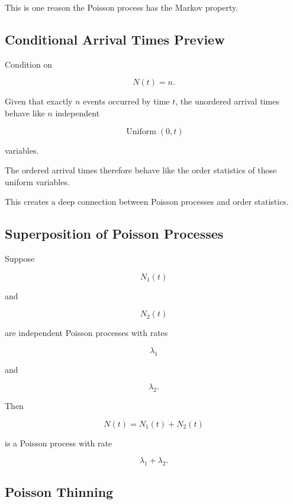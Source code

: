 This is one reason the Poisson process has the Markov property.

\subsection{Conditional Arrival Times Preview}
\label{subsec:conditional-arrival-times-poisson}

Condition on

\[
N(t)=n.
\]

Given that exactly \(n\) events occurred by time \(t\), the unordered
arrival times behave like \(n\) independent

\[
\operatorname{Uniform}(0,t)
\]

variables.

The ordered arrival times therefore behave like the order statistics of
those uniform variables.

This creates a deep connection between Poisson processes and order
statistics.

\subsection{Superposition of Poisson Processes}
\label{subsec:superposition-poisson}

Suppose

\[
N_1(t)
\]

and

\[
N_2(t)
\]

are independent Poisson processes with rates

\[
\lambda_1
\]

and

\[
\lambda_2.
\]

Then

\[
\boxed{
N(t)
=
N_1(t)+N_2(t)
}
\]

is a Poisson process with rate

\[
\boxed{
\lambda_1+\lambda_2.
}
\]

\subsection{Poisson Thinning}
\label{subsec:poisson-thinning}

